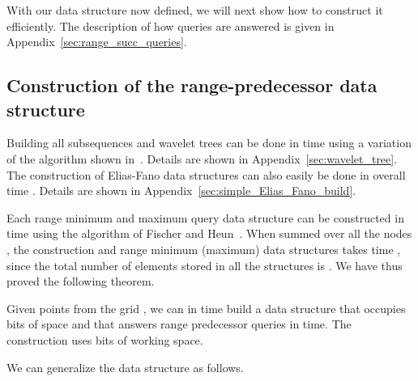 \documentclass[11pt,runningheads]{llncs}
\begin{document}
{With our data structure now defined, we will next show how to construct it efficiently. 
The description of how queries are answered is given in Appendix~\ref{sec:range_succ_queries}. 

\subsection{Construction of the range-predecessor data structure}

Building all subsequences  and wavelet trees  can be done in time 
using a variation of the algorithm shown in~\cite{MNV14,BGKS15}. Details are shown in 
Appendix~\ref{sec:wavelet_tree}. The construction of Elias-Fano data structures can also 
easily be done in overall time . Details are shown in Appendix~\ref{sec:simple_Elias_Fano_build}.

Each range minimum and maximum query data structure 
can be constructed in time  using the algorithm of Fischer and Heun~\cite{FischerH11}.
When summed over all the nodes , the construction  
and range minimum (maximum) data structures takes time , since the total 
number of elements stored in all the structures is . 
We have thus proved the following theorem.

\begin{theorem}
\label{range_pred_theo1}
Given  points from the grid , we can in 
 time build a data structure that occupies 
 bits of space and that answers 
range predecessor queries in  time.
The construction uses  bits of working space. 
\end{theorem}

We can generalize the data structure as follows. 

}
\end{document}

